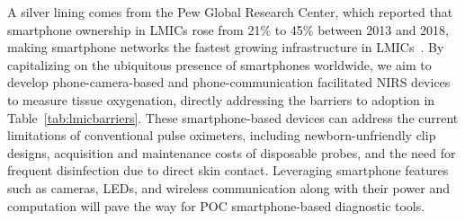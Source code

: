 A silver lining comes from the Pew Global Research Center, which reported that smartphone ownership in \ac{LMIC}s rose from 21\% to 45\% between 2013 and 2018, making smartphone networks the fastest growing infrastructure in \ac{LMIC}s~\cite{Poushter2016}. By capitalizing on the ubiquitous presence of smartphones worldwide, we aim to develop phone-camera-based and phone-communication facilitated \ac{NIRS} devices to measure tissue oxygenation, directly addressing the barriers to adoption in Table~\ref{tab:lmicbarriers}. These smartphone-based devices can address the current limitations of conventional pulse oximeters, including newborn-unfriendly clip designs, acquisition and maintenance costs of disposable probes, and the need for frequent disinfection due to direct skin contact. Leveraging smartphone features such as cameras, \ac{LED}s, and wireless communication along with their power and computation will pave the way for \ac{POC} smartphone-based diagnostic tools. 

